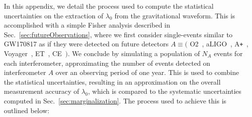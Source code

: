 \documentclass[prd,twocolumn,nofootinbib,superscriptaddress,amsmath,amssymb]{revtex4-1}
\begin{document}
In this appendix, we detail the process used to compute the statistical uncertainties on the extraction of $\lambda_0$ from the gravitational waveform.
This is accomplished with a simple Fisher analysis described in Sec.~\ref{sec:futureObservations}, where we first consider single-events similar to GW170817 as if they were detected on future detectors $A \equiv ($ O2~\cite{aLIGO}, aLIGO~\cite{aLIGO}, A\texttt{+}~\cite{Ap_Voyager_CE}, Voyager~\cite{Ap_Voyager_CE}, ET~\cite{ET}, CE~\cite{Ap_Voyager_CE}$)$.
We conclude by simulating a population of $N_A$ events for each interferometer, approximating the number of events detected on interferometer $A$ over an observing period of one year.
This is used to combine the statistical uncertainties, resulting in an approximation on the overall measurement accuracy of $\lambda_0$, which is compared to the systematic uncertainties computed in Sec.~\ref{sec:marginalization}.
The process used to achieve this is outlined below:
\end{document}
